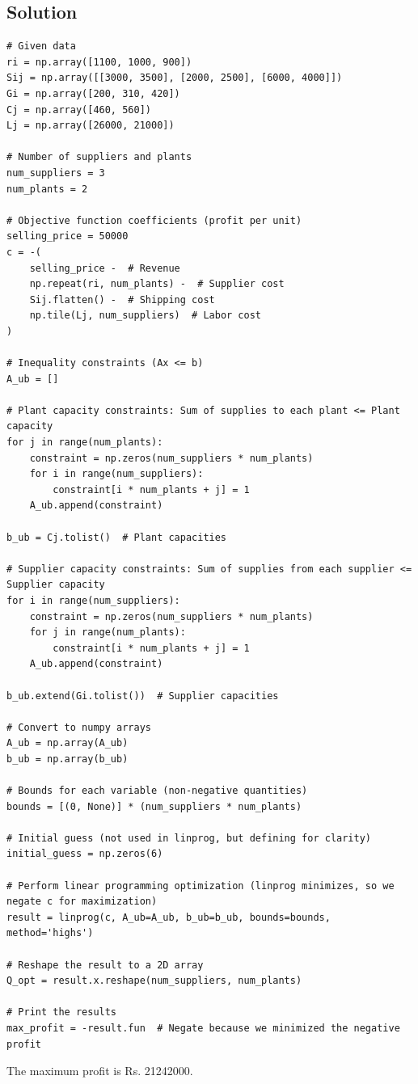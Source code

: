 \documentclass[12pt,a4paper,oneside]{paper} %
\newcommand{\sol}{%
    {\subsection{Solution}} %
    \addcontentsline{toc}{subsection}{Solution}
}
\begin{document}
\sol
\begin{verbatim}
# Given data
ri = np.array([1100, 1000, 900])
Sij = np.array([[3000, 3500], [2000, 2500], [6000, 4000]])
Gi = np.array([200, 310, 420])
Cj = np.array([460, 560])
Lj = np.array([26000, 21000])

# Number of suppliers and plants
num_suppliers = 3
num_plants = 2

# Objective function coefficients (profit per unit)
selling_price = 50000
c = -(
    selling_price -  # Revenue
    np.repeat(ri, num_plants) -  # Supplier cost
    Sij.flatten() -  # Shipping cost
    np.tile(Lj, num_suppliers)  # Labor cost
)

# Inequality constraints (Ax <= b)
A_ub = []

# Plant capacity constraints: Sum of supplies to each plant <= Plant capacity
for j in range(num_plants):
    constraint = np.zeros(num_suppliers * num_plants)
    for i in range(num_suppliers):
        constraint[i * num_plants + j] = 1
    A_ub.append(constraint)

b_ub = Cj.tolist()  # Plant capacities

# Supplier capacity constraints: Sum of supplies from each supplier <= Supplier capacity
for i in range(num_suppliers):
    constraint = np.zeros(num_suppliers * num_plants)
    for j in range(num_plants):
        constraint[i * num_plants + j] = 1
    A_ub.append(constraint)

b_ub.extend(Gi.tolist())  # Supplier capacities

# Convert to numpy arrays
A_ub = np.array(A_ub)
b_ub = np.array(b_ub)

# Bounds for each variable (non-negative quantities)
bounds = [(0, None)] * (num_suppliers * num_plants)

# Initial guess (not used in linprog, but defining for clarity)
initial_guess = np.zeros(6)

# Perform linear programming optimization (linprog minimizes, so we negate c for maximization)
result = linprog(c, A_ub=A_ub, b_ub=b_ub, bounds=bounds, method='highs')

# Reshape the result to a 2D array
Q_opt = result.x.reshape(num_suppliers, num_plants)

# Print the results
max_profit = -result.fun  # Negate because we minimized the negative profit
\end{verbatim}

\vspace{0.5cm}
\noindent The maximum profit is Rs. 21242000.
\end{document}

